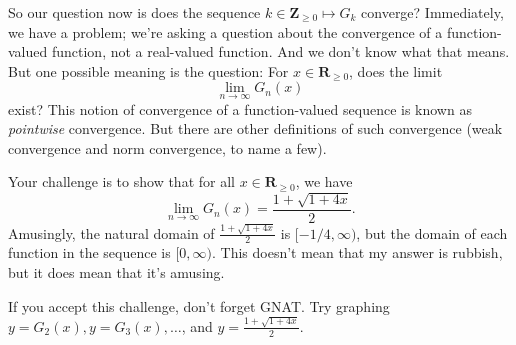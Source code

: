 \documentclass[12pt,fleqn,answers]{exam}
\newcommand{\reals}{\mathbf{R}}
\newcommand{\integers}{\mathbf{Z}}
\begin{document}
\begin{questions}
\quad So our question now is does the sequence $k \in \integers_{\geq 0} \mapsto G_k$ converge?  Immediately, we have a problem; we're asking a 
question about the convergence of a function-valued function, not a real-valued function.  And we don't know what that means.  But one 
possible meaning is the question:  For $x \in \reals_{\geq 0}$, does the limit
\begin{equation*}
      \lim_{n \to \infty} G_n(x) 
\end{equation*}
exist?  This notion of convergence of a function-valued sequence is known as \emph{pointwise} convergence.  But there are other definitions
of such convergence (weak convergence and norm convergence, to name a few).

\quad Your challenge is to show that for all $x \in \reals_{\geq 0}$, we have 
\begin{equation*}
      \lim_{n \to \infty} G_n(x)  = \frac{1 + \sqrt{1 + 4 x}}{2}.
\end{equation*}
Amusingly, the natural domain of $\frac{1 + \sqrt{1 + 4 x}}{2}$ is $[-1/4, \infty)$, but the domain of each function in the sequence is $[0,\infty)$.
This doesn't mean that my answer is rubbish, but it does mean that it's amusing. 

\quad If you accept this challenge, don't forget GNAT.  Try graphing $y = G_2(x), y = G_3(x), \dots$, and $y = \frac{1 + \sqrt{1 + 4 x}}{2}$.


  


\end{questions}
\end{document}

